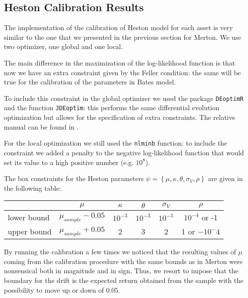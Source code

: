 \subsection{Heston Calibration Results}

The implementation of the calibration of Heston model for each asset is very similar to the one that we presented in the previous section for Merton. We use two optimizer, one global and one local.

The main difference in the maximization of the log-likelihood function is that now we have an extra constraint given by the Feller condition: the same will be true for the calibration of the parameters in Bates model.

To include this constraint in the global optimizer we used the package \texttt{DEoptimR} and the function \texttt{JDEoptim}: this performs the same differential evolution optimization but allows for the specification of extra constraints. The relative manual can be found in \citep{DEoptimR_manual}.

For the local optimization we still used the \texttt{nlminb} function: to include the constraint we added a penalty to the negative log-likelihood function that would set its value to a high positive number (e.g. $10^8$).

The box constraints for the Heston parameters $\psi =  \left\{ \mu, \kappa, \theta, \sigma_V, \rho \right\}$ are given in the following table:

\bigskip

\begin{center}
	\begin{tabular}{lccccc}
		&$\mu$ & $\kappa$ & $\theta$ & $\sigma_V$ & $\rho$ \\
		\midrule
		lower bound & $\mu_{sample}-0.05$ & $10^{-3}$ & $10^{-3}$ &$10^{-5}$ &$10^{-4}$ or -1\\
		upper bound & $\mu_{sample}+0.05 $& 2 & 3 & 2& 1 or $-10^-4$ \\
		\midrule
	\end{tabular}
\end{center}

\bigskip

By running the calibration a few times we noticed that the resulting values of $\mu$ coming from the calibration procedure with the same bounds as in Merton were nonsensical both in magnitude and in sign. Thus, we resort to impose that the boundary for the drift is the expected return obtained from the sample with the possibility to move up or down of 0.05.

